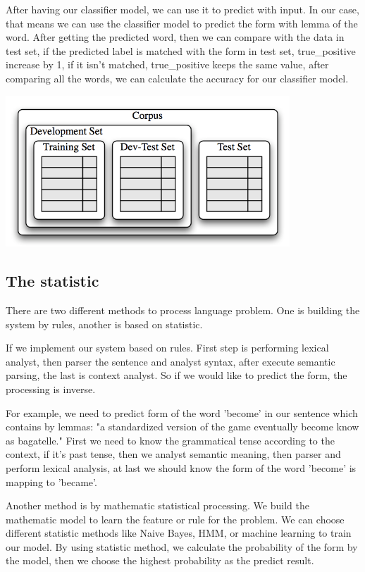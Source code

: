\documentclass[a4paper]{article}
\begin{document}
After having our classifier model, we can use it to predict with input. In our case, that means we can use the classifier model to predict the form with lemma of the word. After getting the predicted word, then we can compare with the data in test set, if the predicted label is matched with the form in test set, true\_positive increase by 1, if it isn't matched, true\_positive keeps the same value, after comparing all the words, we can calculate the accuracy for our classifier model. 


\begin{center}
\includegraphics[width=0.8\textwidth]{Corpus.png}
\end{center}

\subsection{The statistic}

There are two different methods to process language problem. One is building the system by rules, another is based on statistic.

If we implement our system based on rules. First step is performing lexical analyst, then parser the sentence and analyst syntax, after execute semantic parsing, the last is context analyst. So if we would like to predict the form, the processing is inverse. 

For example, we need to predict form of the word 'become' in our sentence which contains by lemmas: "a standardized version of the game eventually become know as bagatelle."
First we need to know the grammatical tense according to the context, if it's past tense, then we analyst semantic meaning, then parser and perform lexical analysis, at last we should know the form of the word 'become' is mapping to 'became'.

Another method is by mathematic statistical processing. We build the mathematic model to learn the feature or rule for the problem. We can choose different statistic methods like Naive Bayes, HMM, or machine learning to train our model. By using statistic method, we calculate the probability of the form by the model, then we choose the highest probability as the predict result. 
\end{document}

